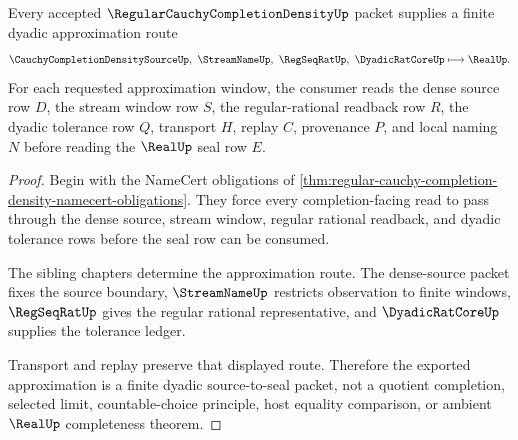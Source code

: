 \begin{theorem}
\label{thm:regular-cauchy-completion-density-dyadic-approximation}
Every accepted $\RegularCauchyCompletionDensityUp$ packet supplies a finite dyadic approximation route
$$
\CauchyCompletionDensitySourceUp,\ \StreamNameUp,\ \RegSeqRatUp,\ \DyadicRatCoreUp \longmapsto \RealUp .
$$
For each requested approximation window, the consumer reads the dense source row $D$, the stream window row $S$, the regular-rational readback row $R$, the dyadic tolerance row $Q$, transport $H$, replay $C$, provenance $P$, and local naming $N$ before reading the $\RealUp$ seal row $E$.
\end{theorem}
\begin{proof}
Begin with the NameCert obligations of \autoref{thm:regular-cauchy-completion-density-namecert-obligations}. They force every completion-facing read to pass through the dense source, stream window, regular rational readback, and dyadic tolerance rows before the seal row can be consumed.

The sibling chapters determine the approximation route. The dense-source packet fixes the source boundary, $\StreamNameUp$ restricts observation to finite windows, $\RegSeqRatUp$ gives the regular rational representative, and $\DyadicRatCoreUp$ supplies the tolerance ledger.

Transport and replay preserve that displayed route. Therefore the exported approximation is a finite dyadic source-to-seal packet, not a quotient completion, selected limit, countable-choice principle, host equality comparison, or ambient $\RealUp$ completeness theorem.
\end{proof}




